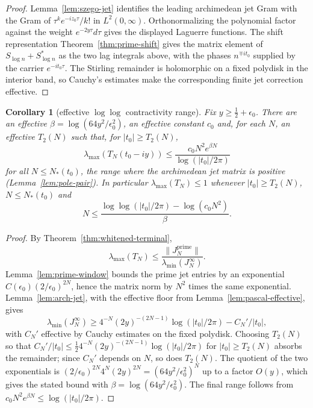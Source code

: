 \documentclass[11pt]{amsart}
\newtheorem{corollary}[theorem]{Corollary}
\theoremstyle{definition}
\theoremstyle{remark}
\theoremstyle{definition}
\newcommand{\half}{\tfrac{1}{2}}
\begin{document}
\begin{proof}
Lemma~\ref{lem:szego-jet} identifies the leading archimedean jet Gram with the Gram of
$\tau^ke^{-iz_0\tau}/k!$ in $L^2(0,\infty)$.  Orthonormalizing the polynomial factor against the
weight $e^{-2y\tau}d\tau$ gives the displayed Laguerre functions.  The shift representation
Theorem~\ref{thm:prime-shift} gives the matrix element of $S_{\log n}+S_{\log n}^*$ as the two lag
integrals above, with the phases $n^{\mp it_0}$ supplied by the carrier $e^{-it_0\tau}$.  The
Stirling remainder is holomorphic on a fixed polydisk in the interior band, so Cauchy's estimates make
the corresponding finite jet correction effective.
\end{proof}

\begin{corollary}[effective $\log\log$ contractivity range]\label{cor:loglog-effective}
Fix $y\ge\half+\epsilon_0$.  There are an effective $\beta=\log(64y^2/\epsilon_0^2)$, an effective
constant $c_0$ and, for each $N$, an effective $T_2(N)$ such that, for $|t_0|\ge T_2(N)$,
\[
   \lambda_{\max}(T_N(t_0-iy))
   \le
   \frac{c_0N^2e^{\beta N}}{\log(|t_0|/2\pi)}
\]
for all $N\le N_*(t_0)$, the range where the archimedean jet matrix is positive
(Lemma~\ref{lem:pole-pair}).  In particular $\lambda_{\max}(T_N)\le1$ whenever $|t_0|\ge T_2(N)$,
$N\le N_*(t_0)$ and
\[
   N\le
   \frac{\log\log(|t_0|/2\pi)-\log(c_0N^2)}{\beta}.
\]
\end{corollary}

\begin{proof}
By Theorem~\ref{thm:whitened-terminal},
\[
   \lambda_{\max}(T_N)\le\frac{\|J_N^{\mathrm{prime}}\|}{\lambda_{\min}(J_N^\infty)}.
\]
Lemma~\ref{lem:prime-window} bounds the prime jet entries by an exponential
$C(\epsilon_0)(2/\epsilon_0)^{2N}$, hence the matrix norm by $N^2$ times the same exponential.
Lemma~\ref{lem:arch-jet}, with the effective floor from Lemma~\ref{lem:pascal-effective}, gives
\[
   \lambda_{\min}(J_N^\infty)
   \ge
   4^{-N}(2y)^{-(2N-1)}\log(|t_0|/2\pi)-C_N'/|t_0|,
\]
with $C_N'$ effective by Cauchy estimates on the fixed polydisk.  Choosing $T_2(N)$ so that
$C_N'/|t_0|\le\frac12 4^{-N}(2y)^{-(2N-1)}\log(|t_0|/2\pi)$ for $|t_0|\ge T_2(N)$ absorbs the
remainder; since $C_N'$ depends on $N$, so does $T_2(N)$.  The quotient of the two exponentials is
$(2/\epsilon_0)^{2N}4^N(2y)^{2N}=(64y^2/\epsilon_0^2)^N$ up to a factor $O(y)$, which gives the stated
bound with $\beta=\log(64y^2/\epsilon_0^2)$.  The final range follows from
$c_0N^2e^{\beta N}\le\log(|t_0|/2\pi)$.
\end{proof}
\end{document}
